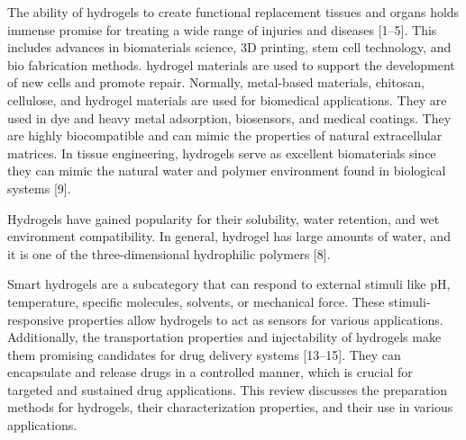 \documentclass[../../main-notes.tex]{subfiles}
\begin{document}
The ability of hydrogels to create functional replacement tissues and organs holds immense promise for treating a wide range of injuries and diseases [1–5]. 
This includes advances in biomaterials science, 3D printing, stem cell technology, and bio fabrication methods.
hydrogel materials are used to support the development of new cells and promote repair. 
Normally, metal-based materials, chitosan, cellulose, and hydrogel materials are used for biomedical applications.
They are used in dye and heavy metal adsorption, biosensors, and medical coatings. 
They are highly biocompatible and can mimic the properties of natural extracellular matrices. 
In tissue engineering, hydrogels serve as excellent biomaterials since they can mimic the natural water and polymer environment found in biological systems [9]. 

Hydrogels have gained popularity for their solubility, water retention, and wet environment compatibility. 
In general, hydrogel has large amounts of water, and it is one of the three-dimensional hydrophilic polymers [8]. 


Smart hydrogels are a subcategory that can respond to external stimuli like pH, temperature, specific molecules, solvents, or mechanical force. 
These stimuli-responsive properties allow hydrogels to act as sensors for various applications. 
Additionally, the transportation properties and injectability of hydrogels make them promising candidates for drug delivery systems [13–15]. 
They can encapsulate and release drugs in a controlled manner, which is crucial for targeted and sustained drug applications. 
This review discusses the preparation methods for hydrogels, their characterization properties, and their use in various applications.
\end{document}
